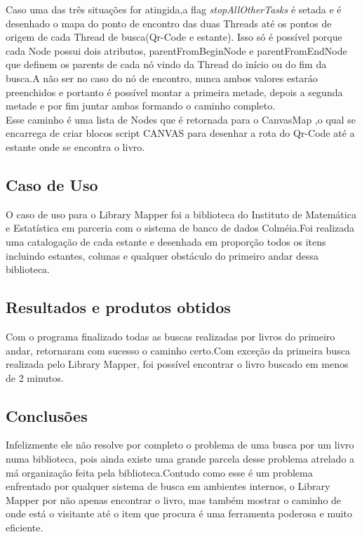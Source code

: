 \documentclass[a4paper,10pt]{article}
\begin{document}
	Caso uma das três situações for atingida,a flag {\it stopAllOtherTasks} é setada e é desenhado o mapa do ponto de encontro
	 das duas Threads até os pontos de origem
	 de cada Thread de busca(Qr-Code
	e estante). Isso só é possível porque cada Node possui dois atributos, parentFromBeginNode e parentFromEndNode que definem os parents de cada
	nó vindo da Thread do início ou do fim da busca.A não ser no caso do nó de encontro, nunca ambos valores estaráo preenchidos e 
	portanto é possível montar a primeira metade, depois a segunda metade e por fim juntar ambas formando o caminho completo.\\

	Esse caminho é uma lista de Nodes que é retornada para o CanvasMap ,o qual se encarrega de criar blocos script CANVAS para desenhar 
	a rota do Qr-Code até a estante onde se encontra o livro.


   \subsection{Caso de Uso}
	O caso de uso para o Library Mapper foi a biblioteca do Instituto de Matemática e Estatística em parceria com
	o sistema de banco de dados Colméia.Foi realizada uma catalogação de
	cada estante e desenhada em proporção todos os itens incluindo estantes, colunas e qualquer obstáculo do primeiro andar dessa biblioteca.
	
	
   \subsection{Resultados e produtos obtidos}
	Com o programa finalizado todas as buscas realizadas por livros do primeiro andar, retornaram com sucesso o caminho certo.Com exceção
	da primeira busca realizada pelo Library Mapper, foi possível encontrar o livro buscado em menos de 2 minutos.
	
   \subsection{Conclusões}
	
	Infelizmente ele não resolve por completo o problema de uma busca por um livro numa biblioteca, pois ainda existe uma grande parcela desse problema atrelado
	a má organização feita pela biblioteca.Contudo como esse é um problema enfrentado por qualquer sistema de busca em ambientes internos, o Library
	Mapper por não apenas encontrar o livro, mas também mostrar o caminho de onde está o visitante até o item que procura é uma ferramenta poderosa e muito eficiente.\\	
	
\end{document}
